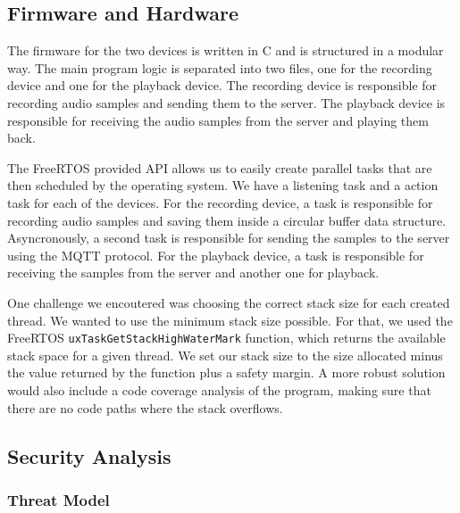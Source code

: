 \documentclass[conference]{IEEEtran}
\begin{document}
\subsection{Firmware and Hardware}

The firmware for the two devices is written in C and is structured in a modular way.
The main program logic is separated into two files, one for the recording device and one for the playback device.
The recording device is responsible for recording audio samples and sending them to the server.
The playback device is responsible for receiving the audio samples from the server and playing them back.

The FreeRTOS provided API allows us to easily create parallel tasks that are then scheduled by the operating system.
We have a listening task and a action task for each of the devices.
For the recording device, a task is responsible for recording audio samples and saving them 
inside a circular buffer data structure. Asyncronously, a second task is responsible for
sending the samples to the server using the MQTT protocol.
For the playback device, a task is responsible for receiving the samples from the server
and another one for playback.

One challenge we encoutered was choosing the correct stack size for each created thread.
We wanted to use the minimum stack size possible.
For that, we used the FreeRTOS \texttt{uxTaskGetStackHighWaterMark} function, which returns
the available stack space for a given thread.
We set our stack size to the size allocated minus the value returned by the function plus a safety margin.
A more robust solution would also include a code coverage analysis\cite{CodeCoverage} of the program,
making sure that there are no code paths where the stack overflows.



\subsection{Security Analysis}
\label{subsec:security_analysis}


\subsubsection{Threat Model}
\end{document}
